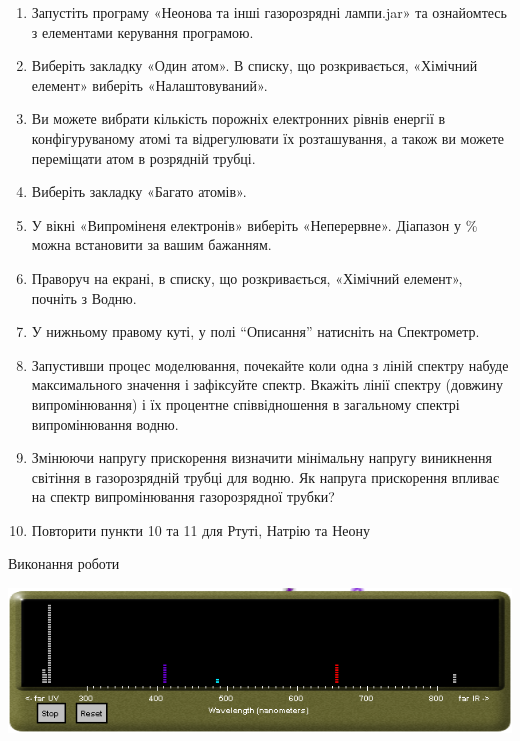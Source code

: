 \documentclass[a4paper,14pt]{extreport}
\begin{document}
\begin{enumerate}
\item Запустіть програму «Неонова та інші газорозрядні лампи.jar» та ознайомтесь з елементами керування програмою.\\

\item Виберіть закладку «Один атом». В списку, що розкривається, «Хімічний 
елемент» виберіть «Налаштовуваний».\\

\item Ви можете вибрати кількість порожніх електронних рівнів енергії в 
конфігуруваному атомі та відрегулювати їх розташування, а також ви можете 
переміщати атом в розрядній трубці.\\

\item Виберіть закладку «Багато атомів».
\item У вікні «Випроміненя електронів» виберіть «Неперервне». Діапазон у \% 
можна встановити за вашим бажанням.
\item Праворуч на екрані, в списку, що розкривається, «Хімічний елемент», почніть 
з Водню.
\item У нижньому правому куті, у полі “Описання” натисніть на Спектрометр.
\item Запустивши процес моделювання, почекайте коли одна з ліній спектру набуде 
максимального значення і зафіксуйте спектр. Вкажіть лінії спектру (довжину 
випромінювання) і їх процентне співвідношення в загальному спектрі 
випромінювання водню. 
\item Змінюючи напругу прискорення визначити мінімальну напругу виникнення 
світіння в газорозрядній трубці для водню. Як напруга прискорення впливає 
на спектр випромінювання газорозрядної трубки?
\item Повторити пункти 10 та 11 для Ртуті, Натрію та Неону
\end{enumerate}
\newpage
\begin{center}
Виконання роботи
\end{center}


	




\begin{center}
 
 
		\includegraphics[width=0.7\linewidth]{1.png}\end{center}
\end{document}

